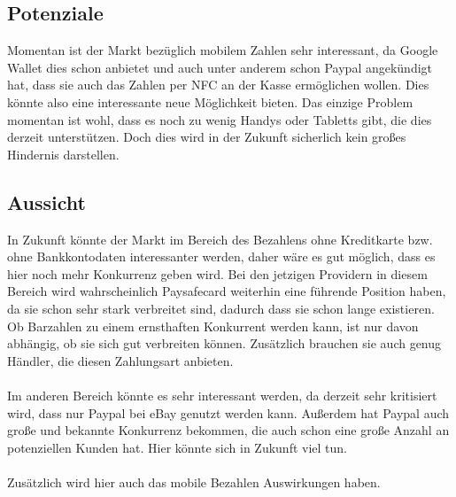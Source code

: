 \subsection{Potenziale}
Momentan ist der Markt bezüglich mobilem Zahlen sehr interessant, da Google Wallet dies schon anbietet und auch unter anderem schon Paypal angekündigt hat, dass sie auch das Zahlen per NFC an der Kasse ermöglichen wollen. Dies könnte also eine interessante neue Möglichkeit bieten. Das einzige Problem momentan ist wohl, dass es noch zu wenig Handys oder Tabletts gibt, die dies derzeit unterstützen. Doch dies wird in der Zukunft sicherlich kein großes Hindernis darstellen.


\subsection{Aussicht}
In Zukunft könnte der Markt im Bereich des Bezahlens ohne Kreditkarte bzw. ohne Bankkontodaten interessanter werden, daher wäre es gut möglich, dass es hier noch mehr Konkurrenz geben wird. Bei den jetzigen Providern in diesem Bereich wird wahrscheinlich Paysafecard weiterhin eine führende Position haben, da sie schon sehr stark verbreitet sind, dadurch dass sie schon lange existieren. Ob Barzahlen zu einem ernsthaften Konkurrent werden kann, ist nur davon abhängig, ob sie sich gut verbreiten können. Zusätzlich brauchen sie auch genug Händler, die diesen Zahlungsart anbieten.\\
\\
Im anderen Bereich könnte es sehr interessant werden, da derzeit sehr kritisiert wird, dass nur Paypal bei eBay genutzt werden kann. Außerdem hat Paypal auch große und bekannte Konkurrenz bekommen, die auch schon eine große Anzahl an potenziellen Kunden hat. Hier könnte sich in Zukunft viel tun.\\
\\
Zusätzlich wird hier auch das mobile Bezahlen Auswirkungen haben.
